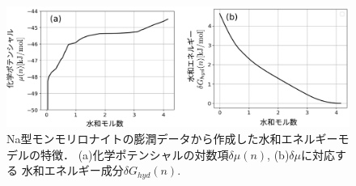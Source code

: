 \begin{figure}[h]
	\begin{center}
	\includegraphics[width=1.0\linewidth]{Figs/fig2.pdf} 
	\end{center}
	\caption{
		Na型モンモリロナイトの膨潤データから作成した水和エネルギーモデルの特徴．
		(a)化学ポテンシャルの対数項$\delta \mu(n)$, (b)$\delta \mu$に対応する
		水和エネルギー成分$\delta G_{hyd}(n)$.
	} 
	\label{fig:fig2}
\end{figure}
